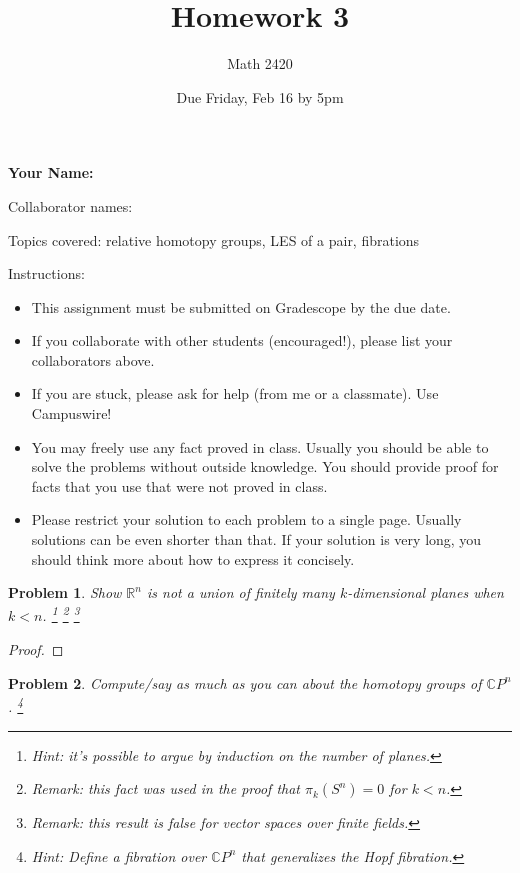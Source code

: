 \documentclass[11pt]{article}
\author{Math 2420}
\date{Due Friday, Feb 16 by 5pm}
\title{Homework 3}
\newtheorem{problem}{Problem}
\begin{document}
\maketitle

{\bf\Large Your Name:} 

Collaborator names: 


\vspace{.3in}
Topics covered: relative homotopy groups, LES of a pair, fibrations

Instructions: 
\begin{itemize}
\item This assignment must be submitted on Gradescope by the due date. 
\item If you collaborate with other students (encouraged!), please list your collaborators above. 
\item If you are stuck, please ask for help (from me or a classmate). Use Campuswire!  
\item You may freely use any fact proved in class. Usually you should be able to solve the problems without outside knowledge. You should provide proof for facts that you use that were not proved in class. 
\item Please restrict your solution to each problem to a single page. Usually solutions can be even shorter than that. If your solution is very long, you should think more about how to express it concisely.
\end{itemize}
\pagebreak 


\pagebreak 


\begin{problem}
Show $\mathbb R^n$ is not a union of finitely many $k$-dimensional planes when $k<n$. 
\footnote{Hint: it's possible to argue by induction on the number of planes.} \footnote{Remark: this fact was used in the proof that $\pi_k(S^n)=0$ for $k<n$. } \footnote{Remark: this result is false for vector spaces over finite fields.}
\end{problem}

\begin{proof}

\end{proof}


\pagebreak

\begin{problem}
Compute/say as much as you can about the homotopy groups of $\mathbb CP^n$.  \footnote{Hint: Define a fibration over $\mathbb CP^n$ that generalizes the Hopf fibration. } 
\end{problem}
\end{document}
